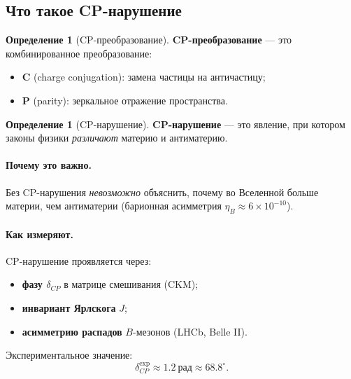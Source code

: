 \documentclass[11pt,a4paper]{article}
\theoremstyle{definition}
\newtheorem{definition}[theorem]{Определение}
\begin{document}
\subsection{Что такое CP-нарушение}
\label{subsec:cp-what}

\begin{definition}[CP-преобразование]
\label{def:cp}
\textbf{CP-преобразование} — это комбинированное преобразование:
\begin{itemize}
    \item \textbf{C} (charge conjugation): замена частицы 
          на античастицу;
    \item \textbf{P} (parity): зеркальное отражение пространства.
\end{itemize}
\end{definition}

\begin{definition}[CP-нарушение]
\label{def:cp-violation}
\textbf{CP-нарушение} — это явление, при котором законы физики 
\emph{различают} материю и антиматерию.
\end{definition}

\paragraph{Почему это важно.}
Без CP-нарушения \emph{невозможно} объяснить, почему во Вселенной 
больше материи, чем антиматерии (барионная асимметрия 
$\eta_B \approx 6 \times 10^{-10}$).

\paragraph{Как измеряют.}
CP-нарушение проявляется через:
\begin{itemize}
    \item \textbf{фазу $\delta_{CP}$} в матрице смешивания (CKM);
    \item \textbf{инвариант Ярлскога} $J$;
    \item \textbf{асимметрию распадов} $B$-мезонов (LHCb, Belle II).
\end{itemize}

Экспериментальное значение:
\begin{equation}
    \delta_{CP}^{\text{exp}} \approx 1.2~\text{рад} \approx 68.8^\circ.
\end{equation}

\end{document}
